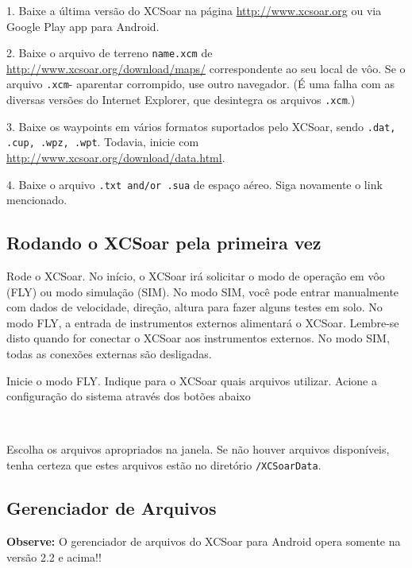 \documentclass[a4paper,12pt]{refrep}
\renewcommand{\config}[3]{\bmenut{Config}{#1/3}{\LARGE$\triangleright$}~\bmenut{#2}{#3}}%
\begin{document}
\begin{compactitem}
\item[1.] Baixe a última versão do XCSoar na página 
{\url{http://www.xcsoar.org}} ou via Google Play app para Android.
\item[2.] Baixe o arquivo de terreno \texttt{name.xcm} de 
{\url{http://www.xcsoar.org/download/maps/}}
correspondente ao seu local de vôo.  Se o arquivo \texttt{.xcm}- aparentar corrompido, use outro navegador. (É uma falha com as diversas versões do Internet Explorer, que desintegra os arquivos \texttt{.xcm}.)
\item[3.] Baixe os waypoints em vários formatos suportados pelo XCSoar, sendo \texttt{.dat, .cup, .wpz, .wpt}. Todavia, inicie com {\url{http://www.xcsoar.org/download/data.html}}.
\item[4.] Baixe o arquivo \texttt{.txt and/or .sua} de espaço aéreo.  Siga novamente o link mencionado.
\end{compactitem}

\subsection{\textcolor{flashblue}{Rodando o XCSoar pela primeira vez}}
Rode o XCSoar.  No início, o XCSoar irá solicitar o modo de operação em vôo (FLY) ou modo simulação (SIM).  No modo SIM, você pode entrar manualmente com dados de velocidade, direção, altura para fazer alguns testes em solo.  No modo FLY, a entrada de instrumentos externos alimentará o XCSoar.  Lembre-se disto quando for conectar o XCSoar aos instrumentos externos.  No modo SIM, todas as conexões externas são desligadas.

Inicie o modo FLY.  Indique para o XCSoar quais arquivos utilizar.  Acione a configuração do sistema através dos botões abaixo

\begin{flushleft}\hspace*{1cm}\config{2}{Sistema}{}\blink{}
\blink{}\\\end{flushleft}

Escolha os arquivos apropriados na janela.  Se não houver arquivos disponíveis, tenha certeza que estes arquivos estão no diretório \texttt{/XCSoarData}.

\subsection{\textcolor{flashblue}{Gerenciador de Arquivos}}
\textbf{Observe:} O gerenciador de arquivos do XCSoar para Android opera somente na versão 2.2 e acima!!
\end{document}
